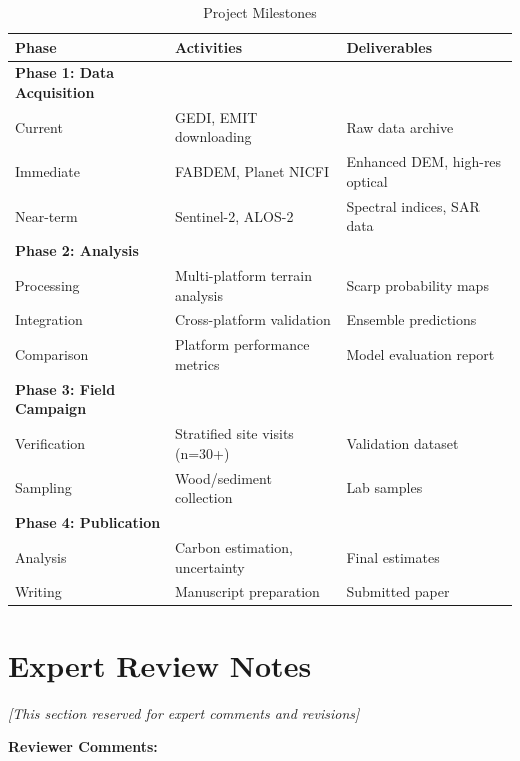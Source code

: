 \documentclass[11pt,letterpaper]{article}
\begin{document}
\begin{table}[h]
\centering
\caption{Project Milestones}
\label{tab:milestones}
\begin{tabular}{lll}
\toprule
\textbf{Phase} & \textbf{Activities} & \textbf{Deliverables} \\
\midrule
\textbf{Phase 1: Data Acquisition} & & \\
\quad Current & GEDI, EMIT downloading & Raw data archive \\
\quad Immediate & FABDEM, Planet NICFI & Enhanced DEM, high-res optical \\
\quad Near-term & Sentinel-2, ALOS-2 & Spectral indices, SAR data \\
\midrule
\textbf{Phase 2: Analysis} & & \\
\quad Processing & Multi-platform terrain analysis & Scarp probability maps \\
\quad Integration & Cross-platform validation & Ensemble predictions \\
\quad Comparison & Platform performance metrics & Model evaluation report \\
\midrule
\textbf{Phase 3: Field Campaign} & & \\
\quad Verification & Stratified site visits (n=30+) & Validation dataset \\
\quad Sampling & Wood/sediment collection & Lab samples \\
\midrule
\textbf{Phase 4: Publication} & & \\
\quad Analysis & Carbon estimation, uncertainty & Final estimates \\
\quad Writing & Manuscript preparation & Submitted paper \\
\bottomrule
\end{tabular}
\end{table}

\section{Expert Review Notes}
\label{sec:review}

\textit{[This section reserved for expert comments and revisions]}

\vspace{2cm}

\noindent\textbf{Reviewer Comments:}

\vspace{5cm}
\end{document}

